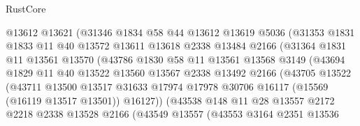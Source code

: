 \begin{lexlean}{RustCore}
\begin{coremodule}
                      @13612
                      @13621
                      (@31346
                        @1834
                        @58
                        @44
                        @13612
                        @13619
                        @5036
                        (@31353
                          @1831
                          @1833
                          @11
                          @40
                          @13572
                          @13611
                          @13618
                          @2338
                          @13484
                          @2166
                          (@31364
                            @1831
                            @11
                            @13561
                            @13570
                            (@43786
                              @1830
                              @58
                              @11
                              @13561
                              @13568
                              @3149
                              (@43694
                                @1829
                                @11
                                @40
                                @13522
                                @13560
                                @13567
                                @2338
                                @13492
                                @2166
                                (@43705
                                  @13522
                                  (@43711
                                    @13500
                                    @13517
                                    @31633
                                    @17974
                                    @17978
                                    @30706
                                    @16117
                                    (@15569 (@16119 @13517 @13501))
                                    @16127))
                                (@43538
                                  @148
                                  @11
                                  @28
                                  @13557
                                  @2172
                                  @2218
                                  @2338
                                  @13528
                                  @2166
                                  (@43549
                                    @13557
                                    (@43553
                                      @3164
                                      @2351
                                      @13536

\end{coremodule}
\end{lexlean}
